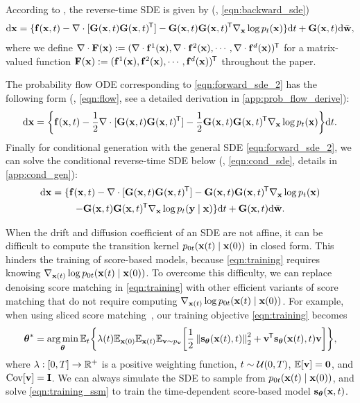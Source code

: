 According to \citep{Anderson1982-ny}, the reverse-time SDE is given by (\cf, \cref{eqn:backward_sde})
\begin{align}
    \mathrm{d} \mathbf{x} = \{\mathbf{f}(\mathbf{x}, t) - \nabla \cdot [\mathbf{G}(\mathbf{x}, t) \mathbf{G}(\mathbf{x},t)^{\mkern-1.5mu\mathsf{T}}] - \mathbf{G}(\mathbf{x},t)\mathbf{G}(\mathbf{x},t)^{\mkern-1.5mu\mathsf{T}}  \nabla_{\mathbf{x}}  \log p_t(\mathbf{x})\} \mathrm{d} t + \mathbf{G}(\mathbf{x}, t) \mathrm{d} \bar{\mathbf{w}},\label{eqn:backward_sde_2}
\end{align}
where we define $\nabla\cdot \mathbf{F}(\mathbf{x}) := (\nabla \cdot \mathbf{f}^1(\mathbf{x}), \nabla\cdot \mathbf{f}^2(\mathbf{x}), \cdots, \nabla\cdot \mathbf{f}^d(\mathbf{x}))^{\mkern-1.5mu\mathsf{T}}$ for a matrix-valued function $\mathbf{F}(\mathbf{x}) := (\mathbf{f}^1(\mathbf{x}), \mathbf{f}^2(\mathbf{x}), \cdots, \mathbf{f}^d(\mathbf{x}))^{\mkern-1.5mu\mathsf{T}}$ throughout the paper. 

The probability flow ODE corresponding to \cref{eqn:forward_sde_2} has the following form (\cf, \cref{eqn:flow}, see a detailed derivation in \cref{app:prob_flow_derive}):
\begin{align}
    \mathrm{d} \mathbf{x} = \bigg\{\mathbf{f}(\mathbf{x}, t) - \frac{1}{2} \nabla \cdot [\mathbf{G}(\mathbf{x}, t)\mathbf{G}(\mathbf{x}, t)^{\mkern-1.5mu\mathsf{T}}] - \frac{1}{2} \mathbf{G}(\mathbf{x}, t)\mathbf{G}(\mathbf{x}, t)^{\mkern-1.5mu\mathsf{T}} \nabla_{\mathbf{x}} \log p_t(\mathbf{x})\bigg\} \mathrm{d} t. \label{eqn:flow_2}
\end{align}
Finally for conditional generation with the general SDE \cref{eqn:forward_sde_2}, we can solve the conditional reverse-time SDE below (\cf, \cref{eqn:cond_sde}, details in \cref{app:cond_gen}):
\begin{multline}
\mathrm{d} \mathbf{x} = \{\mathbf{f}(\mathbf{x}, t) - \nabla \cdot [\mathbf{G}(\mathbf{x}, t) \mathbf{G}(\mathbf{x},t)^{\mkern-1.5mu\mathsf{T}}] - \mathbf{G}(\mathbf{x},t)\mathbf{G}(\mathbf{x},t)^{\mkern-1.5mu\mathsf{T}}  \nabla_{\mathbf{x}}  \log p_t(\mathbf{x})\\ - \mathbf{G}(\mathbf{x},t)\mathbf{G}(\mathbf{x},t)^{\mkern-1.5mu\mathsf{T}}  \nabla_{\mathbf{x}}  \log p_t(\mathbf{y} \mid \mathbf{x})\} \mathrm{d} t + \mathbf{G}(\mathbf{x}, t) \mathrm{d} \bar{\mathbf{w}}.\label{eqn:cond_sde_2}
\end{multline}

When the drift and diffusion coefficient of an SDE are not affine, it can be difficult to compute the transition kernel $p_{0t}(\mathbf{x}(t) \mid \mathbf{x}(0))$ in closed form. This hinders the training of score-based models, because \cref{eqn:training} requires knowing $\nabla_{\mathbf{x}(t)}\log p_{0t}(\mathbf{x}(t) \mid \mathbf{x}(0))$. To overcome this difficulty, we can replace denoising score matching in \cref{eqn:training} with other efficient variants of score matching that do not require computing $\nabla_{\mathbf{x}(t)}\log p_{0t}(\mathbf{x}(t) \mid \mathbf{x}(0))$. For example, when using sliced score matching~\citep{song2019sliced}, our training objective \cref{eqn:training} becomes
\begin{align}
   \bftheta^* = \argmin_\bftheta 
   \mbb{E}_{t}\bigg\{\lambda(t) \mbb{E}_{\bfx(0)}\mbb{E}_{\bfx(t) }\mbb{E}_{\bfv \sim p_\bfv}
   \bigg[\frac{1}{2}\norm{\bfs_\bftheta(\bfx(t), t)}_2^2 + \bfv\tran \bfs_\bftheta(\bfx(t), t) \bfv \bigg]\bigg\}%
   , \label{eqn:training_ssm}
\end{align}
where $\lambda: [0,T] \to \mathbb{R}^+$ is a positive weighting function, $t \sim \mathcal{U}(0, T)$, $\mathbb{E}[\mathbf{v}] = \mathbf{0}$, and $\operatorname{Cov}[\mathbf{v}] = \mathbf{I}$. We can always simulate the SDE to sample from $p_{0t}(\mathbf{x}(t) \mid \mathbf{x}(0))$, and solve \cref{eqn:training_ssm} to train the time-dependent score-based model $\mathbf{s}_{\boldsymbol{\theta}}(\mathbf{x}, t)$.




